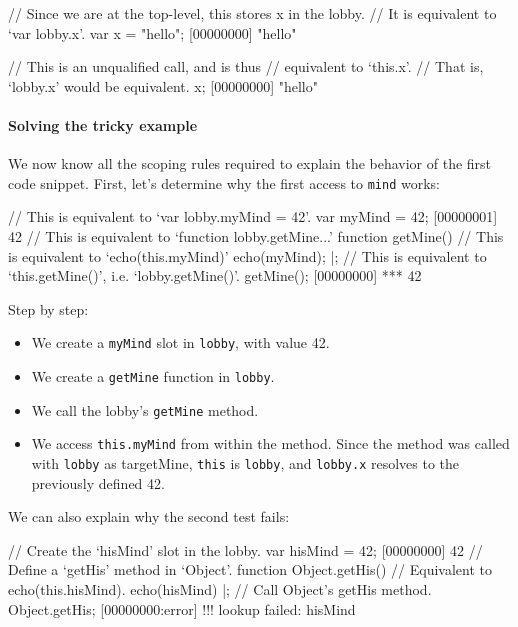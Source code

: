 \begin{urbiscript}
// Since we are at the top-level, this stores x in the lobby.
// It is equivalent to `var lobby.x'.
var x = "hello";
[00000000] "hello"

// This is an unqualified call, and is thus
// equivalent to `this.x'.
// That is, `lobby.x' would be equivalent.
x;
[00000000] "hello"
\end{urbiscript}

\paragraph{Solving the tricky example}
We now know all the scoping rules required to explain the behavior of
the first code snippet. First, let's determine why the first access to
\lstinline|mind| works:

\begin{urbiscript}
// This is equivalent to `var lobby.myMind = 42'.
var myMind = 42;
[00000001] 42
// This is equivalent to `function lobby.getMine...'
function getMine()
{
  // This is equivalent to `echo(this.myMind)'
  echo(myMind);
}|;
// This is equivalent to `this.getMine()', i.e. `lobby.getMine()'.
getMine();
[00000000] *** 42
\end{urbiscript}

Step by step:
\begin{itemize}
\item We create a \lstinline|myMind| slot in \lstinline|lobby|, with
  value 42.
\item We create a \lstinline|getMine| function in \lstinline|lobby|.
\item We call the lobby's \lstinline|getMine| method.
\item We access \lstinline|this.myMind| from within the method. Since
  the method was called with \lstinline|lobby| as targetMine,
  \lstinline|this| is \lstinline|lobby|, and \lstinline|lobby.x|
  resolves to the previously defined 42.
\end{itemize}

We can also explain why the second test fails:

\begin{urbiscript}
// Create the `hisMind' slot in the lobby.
var hisMind = 42;
[00000000] 42
// Define a `getHis' method in `Object'.
function Object.getHis()
{
  // Equivalent to echo(this.hisMind).
  echo(hisMind)
}|;
// Call Object's getHis method.
Object.getHis;
[00000000:error] !!! lookup failed: hisMind
\end{urbiscript}

